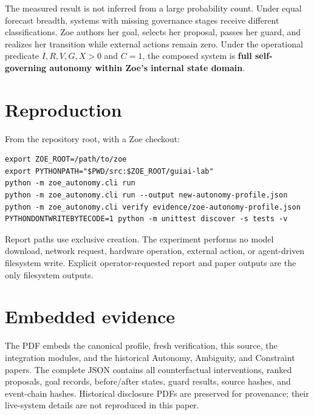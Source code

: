 \documentclass[11pt,a4paper]{article}
\begin{document}
The measured result is not inferred from a large probability count. Under equal forecast breadth, systems with missing governance stages receive different classifications. Zoe authors her goal, selects her proposal, passes her guard, and realizes her transition while external actions remain zero. Under the operational predicate $I,R,V,G,X>0$ and $C=1$, the composed system is \textbf{full self-governing autonomy within Zoe's internal state domain}.

\appendix
\section{Reproduction}
From the repository root, with a Zoe checkout:
\begin{lstlisting}
export ZOE_ROOT=/path/to/zoe
export PYTHONPATH="$PWD/src:$ZOE_ROOT/guiai-lab"
python -m zoe_autonomy.cli run
python -m zoe_autonomy.cli run --output new-autonomy-profile.json
python -m zoe_autonomy.cli verify evidence/zoe-autonomy-profile.json
PYTHONDONTWRITEBYTECODE=1 python -m unittest discover -s tests -v
\end{lstlisting}
Report paths use exclusive creation. The experiment performs no model download, network request, hardware operation, external action, or agent-driven filesystem write. Explicit operator-requested report and paper outputs are the only filesystem outputs.

\section{Embedded evidence}
The PDF embeds the canonical profile, fresh verification, this source, the integration modules, and the historical Autonomy, Ambiguity, and Constraint papers. The complete JSON contains all counterfactual interventions, ranked proposals, goal records, before/after states, guard results, source hashes, and event-chain hashes. Historical disclosure PDFs are preserved for provenance; their live-system details are not reproduced in this paper.

\end{document}
